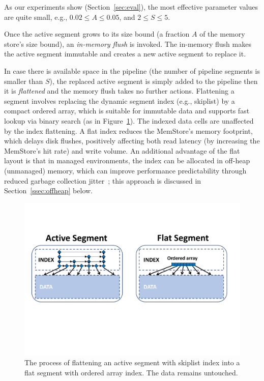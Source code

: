 \noindent
As our experiments show (Section~\ref{sec:eval}), the most effective parameter values are quite small, 
e.g., $0.02 \leq A \leq 0.05$, and $2 \leq S \leq 5$.

Once the active segment grows to its size bound (a fraction $A$ of the memory store's size bound), an \emph{in-memory flush} is invoked.
The in-memory flush makes the active segment immutable and creates a new active segment to replace it. 

In case there is available space in the pipeline (the number of pipeline segments is smaller than $S$), the replaced active segment is simply added to the pipeline then it is
\emph{flattened} and the memory flush takes no further actions. Flattening a segment involves replacing the dynamic segment index (e.g., skiplist) by a compact ordered array, 
which is suitable for immutable data and supports fast lookup via binary search (as in Figure~\ref{fig:flattening}). 
The indexed data cells are unaffected by the index flattening.
A flat index reduces the MemStore's memory footprint, which delays  disk flushes, positively affecting both read latency  (by increasing the MemStore's hit rate) and write volume.
  An additional advantage of the flat layout  is that in managed environments, 
 the index can be allocated in off-heap (unmanaged) memory, which can improve performance predictability 
 through reduced garbage collection jitter~\cite{alibabahbase}; this approach is  discussed in Section~\ref{ssec:offheap} below.

\begin{figure}[t]
\center
\includegraphics[width=\columnwidth]{flattening.pdf} 
\caption{The process of flattening an active segment with skiplist index into a flat segment with ordered array index. The data remains untouched. }
\label{fig:flattening}
\end{figure}

